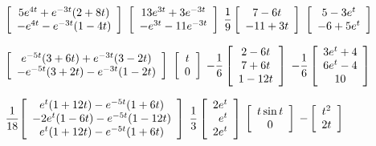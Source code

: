 \medskip

 $\displaystyle{\left[\begin{array}{c}5e^{4t}+e^{-3t}(2+8t)\\
-e^{4t}-e^{-3t}(1-4t)\end{array}\right]}$
 $\displaystyle{\left[\begin{array}{c}13e^{3t}+3e^{-3t}\\
-e^{3t}-11e^{-3t}\end{array}\right]}$
 $\displaystyle{\frac{1}{9}\left[\begin{array}{c}7-6t\\
-11+3t\end{array}\right]}$
 $\displaystyle{\left[\begin{array}{c}5-3e^{t}\\
-6+5e^{t}\end{array}\right]}$

\smallskip

$\displaystyle{\left[\begin{array}{c}e^{-5t}(3+6t)+e^{-3t}(3-2t)\\
-e^{-5t}(3+2t)-e^{-3t}(1-2t)\end{array}\right]}$
 $\displaystyle{\left[\begin{array}{c}t\\0
\end{array}\right]}$
$\displaystyle{-\frac{1}{6}\left[\begin{array}{c}2-6t\\7+6t\\1-12t
\end{array}\right]}$
$\displaystyle{-\frac{1}{6}\left[\begin{array}{c}3e^{t}+4\\6e^{t}-4\\10
\end{array}\right]}$

\smallskip

$\displaystyle\frac{1}{18}{\left[\begin{array}{c}e^{t}(1+12t)-e^{-5t}(1+6t)\\-2e^{t}(1-6t)-
e^{-5t}(1-12t)\\e^{t}(1+12t)-e^{-5t}(1+6t)
\end{array}\right]}$
 $\displaystyle{\frac{1}{3}\left[\begin{array}{r}2e^{t}\\e^{t}\\2e^{t}
\end{array}\right]}$
 $\displaystyle{\left[\begin{array}{c}t\sin t\\0
\end{array}\right]}$
 $\displaystyle{-\left[\begin{array}{c}t^{2}\\2t
\end{array}\right]}$

